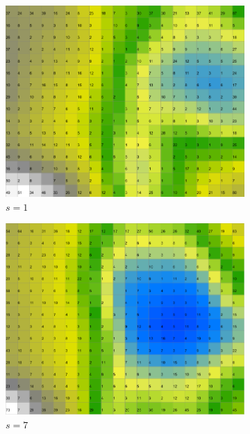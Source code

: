 \documentclass{acm_proc_article-sp}
\begin{document}
\begin{figure}
\centering
    \centering
    \begin{subfigure}[b]{0.30\linewidth}
        \includegraphics[width=\linewidth]{img/wine-newmid-activity-histogram-seed-1}
        \caption{$s=1$}
    \end{subfigure}
    \begin{subfigure}[b]{0.30\linewidth}
        \includegraphics[width=\linewidth]{img/wine-newmid-activity-histogram-seed-7}
        \caption{$s=7$}
    \end{subfigure}
    \begin{subfigure}[b]{0.30\linewidth}

\end{subfigure}
\end{figure}
\end{document}
